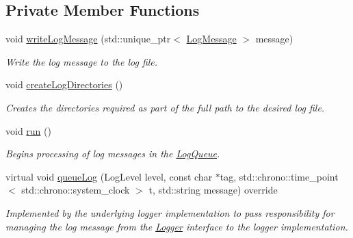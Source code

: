 \subsection*{Private Member Functions}
\begin{DoxyCompactItemize}
\item 
void \hyperlink{class_aws_1_1_iot_1_1_device_client_1_1_logging_1_1_file_logger_aea84d831a8e014a164b85504dd755466}{write\+Log\+Message} (std\+::unique\+\_\+ptr$<$ \hyperlink{class_aws_1_1_iot_1_1_device_client_1_1_logging_1_1_log_message}{Log\+Message} $>$ message)
\begin{DoxyCompactList}\small\item\em Write the log message to the log file. \end{DoxyCompactList}\item 
void \hyperlink{class_aws_1_1_iot_1_1_device_client_1_1_logging_1_1_file_logger_adb5a5536099975ee80b04b1635112d52}{create\+Log\+Directories} ()
\begin{DoxyCompactList}\small\item\em Creates the directories required as part of the full path to the desired log file. \end{DoxyCompactList}\item 
void \hyperlink{class_aws_1_1_iot_1_1_device_client_1_1_logging_1_1_file_logger_a3c6b08640df02c4065c358523dc6a37d}{run} ()
\begin{DoxyCompactList}\small\item\em Begins processing of log messages in the \hyperlink{class_aws_1_1_iot_1_1_device_client_1_1_logging_1_1_log_queue}{Log\+Queue}. \end{DoxyCompactList}\item 
virtual void \hyperlink{class_aws_1_1_iot_1_1_device_client_1_1_logging_1_1_file_logger_a549cf9783ce070e514c0f68340ae5d1c}{queue\+Log} (Log\+Level level, const char $\ast$tag, std\+::chrono\+::time\+\_\+point$<$ std\+::chrono\+::system\+\_\+clock $>$ t, std\+::string message) override
\begin{DoxyCompactList}\small\item\em Implemented by the underlying logger implementation to pass responsibility for managing the log message from the \hyperlink{class_aws_1_1_iot_1_1_device_client_1_1_logging_1_1_logger}{Logger} interface to the logger implementation. \end{DoxyCompactList}\end{DoxyCompactItemize}
